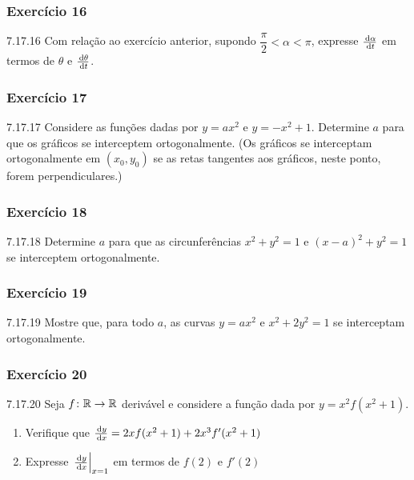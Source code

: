 \subsubsection*{Exercício 16}
\begin{exercicio}[16]{7.17.16}
Com relação ao exercício anterior, supondo $\dfrac{\pi}{2} < \alpha < \pi$, expresse $\frac{\,\mathrm{d} \alpha}{\,\mathrm{d} t}$ em termos de $\theta$ e $\frac{\,\mathrm{d} \theta}{\,\mathrm{d} t}$.
\end{exercicio}

\subsubsection*{Exercício 17}
\begin{exercicio}[17]{7.17.17}
Considere as funções dadas por $y = ax^2$ e $y = -x^2 + 1$. Determine $a$ para que os gráficos se interceptem ortogonalmente. (Os gráficos se interceptam ortogonalmente em $(x_0, y_0)$ se as retas tangentes aos gráficos, neste ponto, forem perpendiculares.)
\end{exercicio}

\subsubsection*{Exercício 18}
\begin{exercicio}[18]{7.17.18}
Determine $a$ para que as circunferências $x^2 + y^2 = 1$ e $(x - a)^2 + y^2 = 1$ se interceptem ortogonalmente.
\end{exercicio}

\subsubsection*{Exercício 19}
\begin{exercicio}[19]{7.17.19}
Mostre que, para todo $a$, as curvas $y = ax^2$ e $x^2 + 2y^2 = 1$ se interceptam ortogonalmente.
\end{exercicio}

\subsubsection*{Exercício 20}
\begin{exercicio}[20]{7.17.20}
Seja $f\colon \mathbb{R} \to \mathbb{R}$ derivável e considere a função dada por $y = x^2 f(x^2 + 1)$.
\begin{enumerate}[label=\alph*)]
    \item Verifique que $\frac{\,\mathrm{d} y}{\,\mathrm{d} x} = 2x f(x^2 + 1) + 2x^3 f'(x^2 + 1)$
    \item Expresse $\left.\frac{\,\mathrm{d} y}{\,\mathrm{d} x}\right|_{x = 1}$ em termos de $f(2)$ e $f'(2)$
\end{enumerate}
\end{exercicio}

